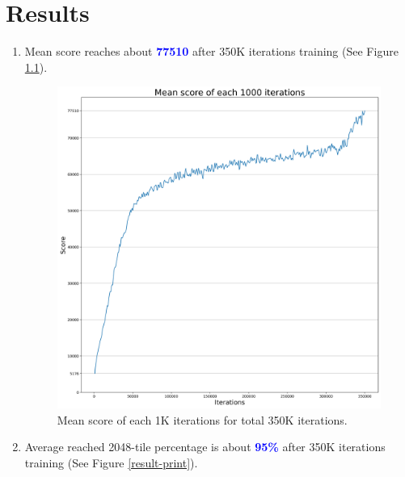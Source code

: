 \chapter{Results}\label{chapter-results}
\indent
	\begin{enumerate}
		\item Mean score reaches about \textcolor{blue}{\textbf{77510}} after 350K iterations training (See Figure \ref{result-plot}).
		\begin{figure}[H]
			\centering
			\includegraphics[scale=0.4]{img/result-plot.png}
			\caption{Mean score of each 1K iterations for total 350K iterations.}
			\label{result-plot}
		\end{figure}
		\pagebreak
		\item Average reached 2048-tile percentage is about \textcolor{blue}{\textbf{95\%}} after 350K iterations training (See Figure \ref{result-print}).
		\begin{figure}[H]
			\centering

\end{figure}
\end{enumerate}
